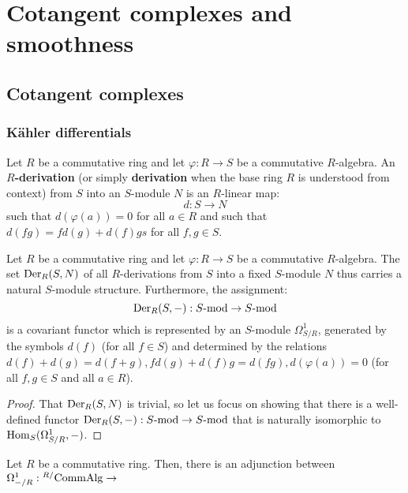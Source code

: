 \section{Cotangent complexes and smoothness}
    \subsection{Cotangent complexes}
        \subsubsection{K\"ahler differentials} \label{subsubsection: kahler_differentials}
            \begin{definition} \label{def: kahler_differentials}
                Let $R$ be a commutative ring and let $\varphi: R \to S$ be a commutative $R$-algebra. An \textbf{$R$-derivation} (or simply \textbf{derivation} when the base ring $R$ is understood from context) from $S$ into an $S$-module $N$ is an $R$-linear map:
                    $$d: S \to N$$
                such that $d(\varphi(a)) = 0$ for all $a \in R$ and such that $d(fg) = fd(g) + d(f)gs$ for all $f, g \in S$.
            \end{definition}
            \begin{lemma} \label{lemma: modules_of_derivations}
                Let $R$ be a commutative ring and let $\varphi: R \to S$ be a commutative $R$-algebra. The set $\mathrm{Der}_R(S, N)$ of all $R$-derivations from $S$ into a fixed $S$-module $N$ thus carries a natural $S$-module structure. Furthermore, the assignment:
                    $$\mathrm{Der}_R(S, -): S\text{-}\mathrm{mod} \to S\text{-}\mathrm{mod}$$
                is a covariant functor which is represented by an $S$-module $\Omega^1_{S/R}$, generated by the symbols $d(f)$ (for all $f \in S$) and determined by the relations $d(f) + d(g) = d(f + g), fd(g) + d(f)g = d(fg), d(\varphi(a)) = 0$ (for all $f, g \in S$ and all $a \in R$).
            \end{lemma}
                \begin{proof}
                    That $\mathrm{Der}_R(S, N)$ is trivial, so let us focus on showing that there is a well-defined functor $\mathrm{Der}_R(S, -): S\text{-}\mathrm{mod} \to S\text{-}\mathrm{mod}$ that is naturally isomorphic to $\mathrm{Hom}_S(\Omega^1_{S/R}, -)$. 
                \end{proof}
            \begin{theorem} \label{theorem: kahler_differentials_universal_property}
                Let $R$ be a commutative ring. Then, there is an adjunction between $\Omega^1_{-/R}: {}^{R/}\mathrm{Comm}\mathrm{Alg} \to $ 
            \end{theorem}
            
